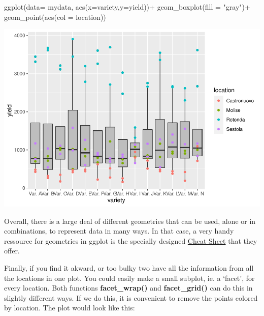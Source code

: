 \documentclass[
]{book}
\newenvironment{Shaded}{\begin{snugshade}}{\end{snugshade}}
\newcommand{\AttributeTok}[1]{\textcolor[rgb]{0.77,0.63,0.00}{#1}}
\newcommand{\FunctionTok}[1]{\textcolor[rgb]{0.00,0.00,0.00}{#1}}
\newcommand{\NormalTok}[1]{#1}
\newcommand{\SpecialCharTok}[1]{\textcolor[rgb]{0.00,0.00,0.00}{#1}}
\newcommand{\StringTok}[1]{\textcolor[rgb]{0.31,0.60,0.02}{#1}}
\begin{document}
\begin{Shaded}
\begin{Highlighting}[]
\FunctionTok{ggplot}\NormalTok{(}\AttributeTok{data=}\NormalTok{ mydata,  }\FunctionTok{aes}\NormalTok{(}\AttributeTok{x=}\NormalTok{variety,}\AttributeTok{y=}\NormalTok{yield))}\SpecialCharTok{+} 
  \FunctionTok{geom\_boxplot}\NormalTok{(}\AttributeTok{fill =} \StringTok{"gray"}\NormalTok{)}\SpecialCharTok{+} 
  \FunctionTok{geom\_point}\NormalTok{(}\FunctionTok{aes}\NormalTok{(}\AttributeTok{col =}\NormalTok{ location)) }
\end{Highlighting}
\end{Shaded}

\includegraphics[width=1.5\linewidth]{PPB-Toolkit-for-R-and-R-Studio_files/figure-latex/unnamed-chunk-62-1}

Overall, there is a large deal of different geometries that can be used, alone or in combinations, to represent data in many ways. In that case, a very handy ressource for geometries in ggplot is the specially designed \href{https://www.maths.usyd.edu.au/u/UG/SM/STAT3022/r/current/Misc/data-visualization-2.1.pdf}{Cheat Sheet} that they offer.

Finally, if you find it akward, or too bulky two have all the information from all the locations in one plot. You could easily make a small subplot, ie. a `facet', for every location. Both functions \textbf{facet\_wrap() } and \textbf{facet\_grid() } can do this in slightly different ways. If we do this, it is convenient to remove the points colored by location. The plot would look like this:
\end{document}
